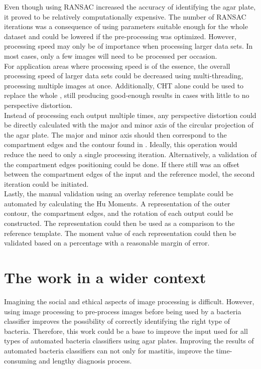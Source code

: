 \noindent Even though using RANSAC increased the accuracy of identifying the agar plate, it proved to be relatively computationally expensive. The number of RANSAC iterations was a consequence of using parameters suitable enough for the whole dataset and could be lowered if the pre-processing was optimized. However, processing speed may only be of importance when processing larger data sets. In most cases, only a few images will need to be processed per occasion.\\

\noindent For application areas where processing speed is of the essence, the overall processing speed of larger data sets could be decreased using multi-threading, processing multiple images at once. Additionally, CHT alone could be used to replace the whole , still producing good-enough results in cases with little to no perspective distortion.\\

\noindent Instead of processing each output multiple times, any perspective distortion could be directly calculated with the major and minor axis of the circular projection of the agar plate. The major and minor axis should then correspond to the compartment edges and the contour found in . Ideally, this operation would reduce the need to only a single processing iteration. Alternatively, a validation of the compartment edges positioning could be done. If there still was an offset between the compartment edges of the input and the reference model, the second iteration could be initiated. \\

\noindent Lastly, the manual validation using an overlay reference template could be automated by calculating the Hu Moments. A representation of the outer contour, the compartment edges, and the rotation of each output could be constructed. The representation could then be used as a comparison to the reference template. The moment value of each representation could then be validated based on a percentage with a reasonable margin of error. 
\newpage
\section{The work in a wider context}
\label{sec:work-wider-context}
Imagining the social and ethical aspects of image processing is difficult. However, using image processing to pre-process images before being used by a bacteria classifier improves the possibility of correctly identifying the right type of bacteria. Therefore, this work could be a base to improve the input used for all types of automated bacteria classifiers using agar plates. Improving the results of automated bacteria classifiers can not only for mastitis, improve the time-consuming and lengthy diagnosis process. \\
 
